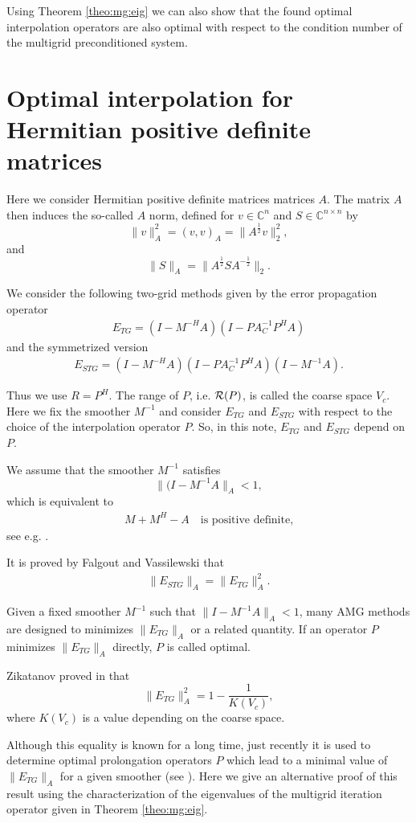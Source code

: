 \documentclass[final]{siamltex}
\newcommand{\uha}{^{\frac{1}{2}}}
\newcommand{\umha}{^{-\frac{1}{2}}}
\newcommand{\beq}{\begin{eqnarray}}
\newcommand{\eeq}{\end{eqnarray}}
\numberwithin{equation}{section}
\newcommand{\ran} {{\cal R}}
\newcommand{\bCn}{\mathbb{C}^n}
\newcommand{\Cnn}{\mathbb{C}^{n \times n}}
\begin{document}
 Using Theorem \ref{theo:mg:eig} we can also show that the found   optimal interpolation operators are also optimal  with 
respect to the condition number  of the multigrid preconditioned system.

 

\section{Optimal interpolation  for Hermitian positive definite matrices}

Here   we  consider Hermitian  positive definite matrices matrices $A$. The matrix $A$ then induces the so-called $A$ norm, defined for $v \in \bCn$ and $S \in \Cnn$ by
\[
\| v \|_A^2 = (v,v)_A = \|A\uha v\|_2^2,
\]
and 
\[
\| S \|_A = \|A\uha S A\umha\|_2.
\]

We consider  the  following two-grid  methods given by the error propagation operator
\beq \label{mge}
E_{TG} = (I-M^{-H}A)(I -  PA_C^{-1}P^HA)
\eeq
and the  symmetrized version 
\beq \label{smge}
E_{STG} = (I-M^{-H}A)(I -  PA_C^{-1}P^HA)(I-M^{-1}A).
\eeq

Thus  we use $R = P^H$. The range of $P$, i.e. $\ran (P)$, is called  the coarse space $V_c$.  
Here   we fix  the smoother $M^{-1}$ and consider $E_{TG}$ and $E_{STG}$ with respect  to the choice of the interpolation operator $P$. So, in this note, 
$E_{TG}$ and $E_{STG}$ depend on $P$.


We assume that the smoother $M^{-1}$ satisfies 
\[
 \|(I-M^{-1}A \|_A < 1,
\]
which is equivalent to 
\beq \label{eq:pos}
M +  M^{H} - A  \quad \mbox{is  positive definite,} 
\eeq
see e.g. \cite{Vas08}. 

It is proved by  Falgout and Vassilewski \cite{FalV04} that
\beq \label{normeq}
\|E_{STG}\|_A = \|E_{TG}\|_A^2.
\eeq

Given a fixed  smoother $M^{-1}$ such that $\| I-M^{-1}A\|_A < 1$, many AMG methods are designed to minimizes $ \|E_{TG}\|_A$ or a related quantity. If an operator  $P$ minimizes    $ \|E_{TG}\|_A$  directly, $P$ is called optimal. 

Zikatanov proved in \cite{Zik08} that
\[
 \|E_{TG}\|_A^2 = 1 - \frac{1}{K(V_c)},
\]
where  $ K(V_c)$ is  a  value  depending  on the  coarse  space.

Although  this 
equality is known for a long time, just  recently it is used to determine optimal prolongation operators $P$  which lead   to a minimal  value of $\|E_{TG}\|_A$ for a given smoother (see \cite{XuZ17, Bra18}).  Here  we give an  alternative proof of this result using the characterization of the eigenvalues of the multigrid iteration operator  given in Theorem \ref{theo:mg:eig}.    
\end{document}
